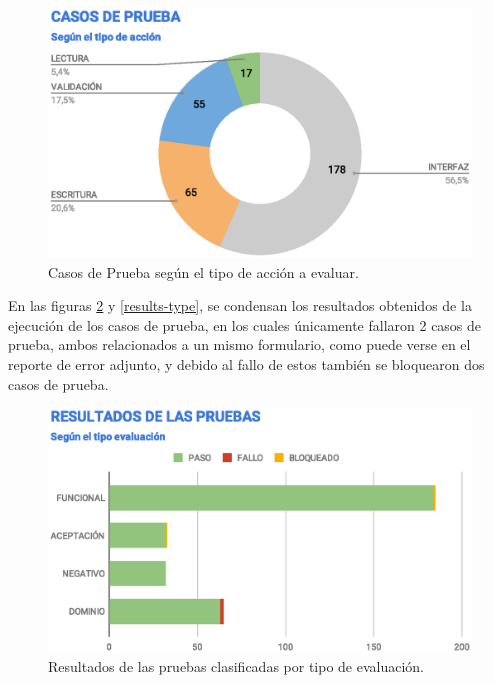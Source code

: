 \begin{figure}
\centering
\includegraphics[width=1.0\textwidth]{graphics/tc-type.eps}
\caption{Casos de Prueba según el tipo de acción a evaluar.}
\label{tc-type}
\end{figure}

En las figuras \ref{results-tests} y \ref{results-type}, se condensan los
resultados obtenidos de la ejecución de los casos de prueba, en los cuales
únicamente fallaron 2 casos de prueba, ambos relacionados a un mismo formulario,
como puede verse en el reporte de error adjunto, y debido al fallo de estos
también se bloquearon dos casos de prueba.

\begin{figure}
\centering
\includegraphics[width=1.0\textwidth]{graphics/results-tests.eps}
\caption{Resultados de las pruebas clasificadas por tipo de evaluación.}
\label{results-tests}
\end{figure}


